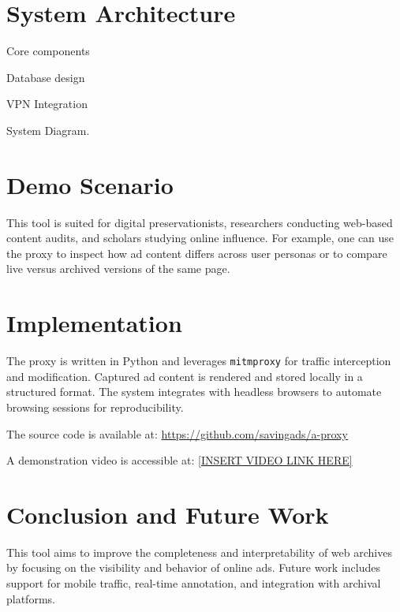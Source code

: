 \documentclass[sigconf]{acmart}
\begin{document}
\section{System Architecture}
Core components

Database design

VPN Integration

System Diagram.

\section{Demo Scenario}
This tool is suited for digital preservationists, researchers conducting web-based content audits, and scholars studying online influence. For example, one can use the proxy to inspect how ad content differs across user personas or to compare live versus archived versions of the same page.

\section{Implementation}
The proxy is written in Python and leverages \texttt{mitmproxy} for traffic interception and modification. Captured ad content is rendered and stored locally in a structured format. The system integrates with headless browsers to automate browsing sessions for reproducibility.

The source code is available at: \url{https://github.com/savingads/a-proxy}

A demonstration video is accessible at: \url{[INSERT VIDEO LINK HERE]}

\section{Conclusion and Future Work}
This tool aims to improve the completeness and interpretability of web archives by focusing on the visibility and behavior of online ads. Future work includes support for mobile traffic, real-time annotation, and integration with archival platforms.



\end{document}

